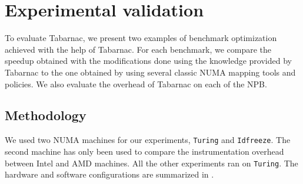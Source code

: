 \section{Experimental validation}
\label{sec:tab-expe}

To evaluate \gls{Tabarnac}, we present two examples of benchmark optimization achieved with the help of \gls{Tabarnac}.
For each benchmark, we compare the speedup obtained with the modifications done using the knowledge provided by \gls{Tabarnac} to the one obtained by using several classic \gls{NUMA} mapping tools and policies.
We also evaluate the overhead of \gls{Tabarnac} on each of the \gls{NPB}.

\subsection{Methodology}


We used two NUMA machines for our experiments, \texttt{Turing} and \texttt{Idfreeze}.
The second machine has only been used to compare the instrumentation overhead between Intel and AMD machines.
All the other experiments ran on \texttt{Turing}.
The hardware and software configurations are summarized in .

